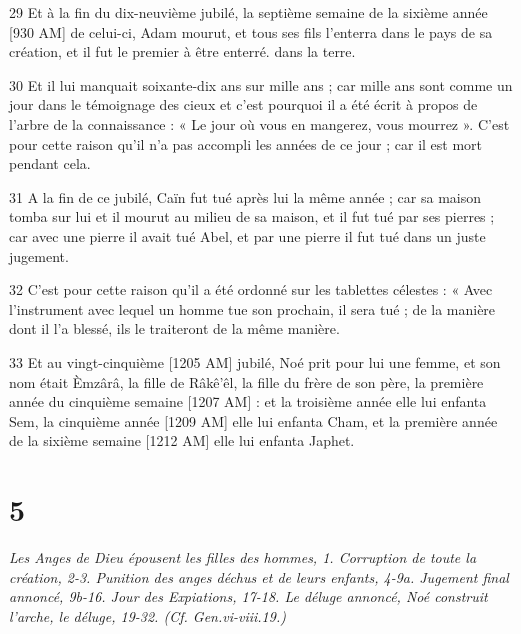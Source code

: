 \par 29 Et à la fin du dix-neuvième jubilé, la septième semaine de la sixième année [930 AM] de celui-ci, Adam mourut, et tous ses fils l'enterra dans le pays de sa création, et il fut le premier à être enterré. dans la terre.
\par 30 Et il lui manquait soixante-dix ans sur mille ans ; car mille ans sont comme un jour dans le témoignage des cieux et c'est pourquoi il a été écrit à propos de l'arbre de la connaissance : « Le jour où vous en mangerez, vous mourrez ». C'est pour cette raison qu'il n'a pas accompli les années de ce jour ; car il est mort pendant cela.
\par 31 A la fin de ce jubilé, Caïn fut tué après lui la même année ; car sa maison tomba sur lui et il mourut au milieu de sa maison, et il fut tué par ses pierres ; car avec une pierre il avait tué Abel, et par une pierre il fut tué dans un juste jugement.
\par 32 C'est pour cette raison qu'il a été ordonné sur les tablettes célestes : « Avec l'instrument avec lequel un homme tue son prochain, il sera tué ; de la manière dont il l'a blessé, ils le traiteront de la même manière.
\par 33 Et au vingt-cinquième [1205 AM] jubilé, Noé prit pour lui une femme, et son nom était \`Emzârâ, la fille de Râkê'êl, la fille du frère de son père, la première année du cinquième semaine [1207 AM] : et la troisième année elle lui enfanta Sem, la cinquième année [1209 AM] elle lui enfanta Cham, et la première année de la sixième semaine [1212 AM] elle lui enfanta Japhet.

\chapter{5}

\par \textit{Les Anges de Dieu épousent les filles des hommes, 1. Corruption de toute la création, 2-3. Punition des anges déchus et de leurs enfants, 4-9a. Jugement final annoncé, 9b-16. Jour des Expiations, 17-18. Le déluge annoncé, Noé construit l'arche, le déluge, 19-32. (Cf. Gen.vi-viii.19.)}

